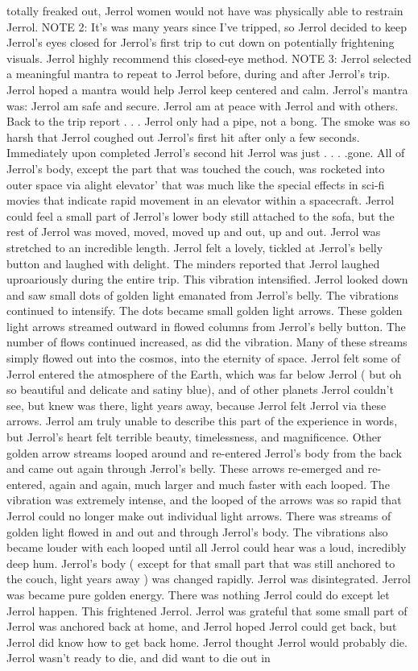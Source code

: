 \documentclass[12pt]{book}
\begin{document}
totally freaked out, Jerrol women would not have was physically able to restrain Jerrol. NOTE 2: It's was many years since I've tripped, so Jerrol decided to keep Jerrol's eyes closed for Jerrol's first trip to cut down on potentially frightening visuals. Jerrol highly recommend this closed-eye method. NOTE 3: Jerrol selected a meaningful mantra to repeat to Jerrol before, during and after Jerrol's trip. Jerrol hoped a mantra would help Jerrol keep centered and calm. Jerrol's mantra was: Jerrol am safe and secure. Jerrol am at peace with Jerrol and with others. Back to the trip report . . .  Jerrol only had a pipe, not a bong. The smoke was so harsh that Jerrol coughed out Jerrol's first hit after only a few seconds. Immediately upon completed Jerrol's second hit Jerrol was just . . .  .gone. All of Jerrol's body, except the part that was touched the couch, was rocketed into outer space via alight elevator' that was much like the special effects in sci-fi movies that indicate rapid movement in an elevator within a spacecraft. Jerrol could feel a small part of Jerrol's lower body still attached to the sofa, but the rest of Jerrol was moved, moved, moved up and out, up and out. Jerrol was stretched to an incredible length. Jerrol felt a lovely, tickled at Jerrol's belly button and laughed with delight. The minders reported that Jerrol laughed uproariously during the entire trip. This vibration intensified. Jerrol looked down and saw small dots of golden light emanated from Jerrol's belly. The vibrations continued to intensify. The dots became small golden light arrows. These golden light arrows streamed outward in flowed columns from Jerrol's belly button. The number of flows continued increased, as did the vibration. Many of these streams simply flowed out into the cosmos, into the eternity of space. Jerrol felt some of Jerrol entered the atmosphere of the Earth, which was far below Jerrol ( but oh so beautiful and delicate and satiny blue), and of other planets Jerrol couldn't see, but knew was there, light years away, because Jerrol felt Jerrol via these arrows. Jerrol am truly unable to describe this part of the experience in words, but Jerrol's heart felt terrible beauty, timelessness, and magnificence. Other golden arrow streams looped around and re-entered Jerrol's body from the back and came out again through Jerrol's belly. These arrows re-emerged and re-entered, again and again, much larger and much faster with each looped. The vibration was extremely intense, and the looped of the arrows was so rapid that Jerrol could no longer make out individual light arrows. There was streams of golden light flowed in and out and through Jerrol's body. The vibrations also became louder with each looped until all Jerrol could hear was a loud, incredibly deep hum. Jerrol's body ( except for that small part that was still anchored to the couch, light years away ) was changed rapidly. Jerrol was disintegrated. Jerrol was became pure golden energy. There was nothing Jerrol could do except let Jerrol happen. This frightened Jerrol. Jerrol was grateful that some small part of Jerrol was anchored back at home, and Jerrol hoped Jerrol could get back, but Jerrol did know how to get back home. Jerrol thought Jerrol would probably die. Jerrol wasn't ready to die, and did want to die out in 
\end{document}

